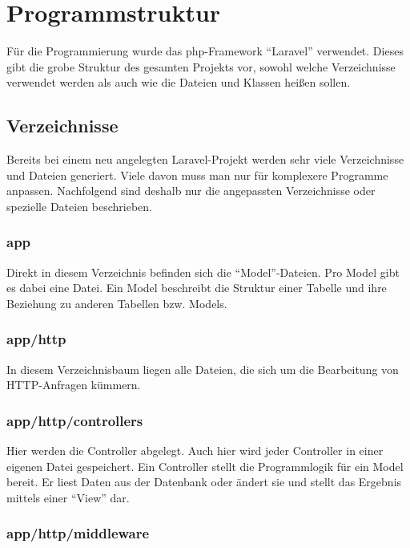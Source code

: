 \section{Programmstruktur}

Für die Programmierung wurde das php-Framework "`Laravel"' verwendet. Dieses gibt die grobe Struktur des gesamten Projekts vor, sowohl welche Verzeichnisse verwendet werden als auch wie die Dateien und Klassen heißen sollen. \cite{laravel}

\subsection{Verzeichnisse}

Bereits bei einem neu angelegten Laravel-Projekt werden sehr viele Verzeichnisse und Dateien generiert. Viele davon muss man nur für komplexere Programme anpassen. Nachfolgend sind deshalb nur die angepassten Verzeichnisse oder spezielle Dateien beschrieben.

\subsubsection{app}

Direkt in diesem Verzeichnis befinden sich die "`Model"'-Dateien. Pro Model gibt es dabei eine Datei. Ein Model beschreibt die Struktur einer Tabelle und ihre Beziehung zu anderen Tabellen bzw. Models.

\subsubsection{app/http}

In diesem Verzeichnisbaum liegen alle Dateien, die sich um die Bearbeitung von HTTP-Anfragen kümmern.

\subsubsection{app/http/controllers}

Hier werden die Controller abgelegt. Auch hier wird jeder Controller in einer eigenen Datei gespeichert. Ein Controller stellt die Programmlogik für ein Model bereit. Er liest Daten aus der Datenbank oder ändert sie und stellt das Ergebnis mittels einer "`View"' dar.

\subsubsection{app/http/middleware} 

